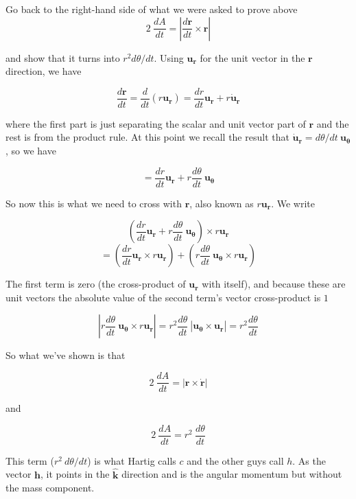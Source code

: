 \documentclass[11pt, oneside]{article}   	%
\begin{document}
Go back to the right-hand side of what we were asked to prove above
\[ 2 \ \frac{dA}{dt} =  | \frac{d\mathbf{r}}{dt} \times \mathbf{r} | \]

and show that it turns into $r^2 d\theta/dt$.  Using $\mathbf{u_r}$ for the unit vector in the $\mathbf{r}$ direction, we have

\[ \frac{d\mathbf{r}}{dt}  = \frac{d}{dt} (r \mathbf{u_r}) = \frac{dr}{dt} \mathbf{u_r} + r \dot{\mathbf{u}}_\mathbf{r} \]

where the first part is just separating the scalar and unit vector part of $\mathbf{r}$ and the rest is from the product rule.  At this point we recall the result that $\dot{\mathbf{u}}_\mathbf{r}  = d \theta/dt \ \mathbf{u_\theta}$, so we have

\[ = \frac{dr}{dt} \mathbf{u_r} + r  \frac{d \theta}{dt} \ \mathbf{u_\theta} \]

So now this is what we need to cross with $\mathbf{r}$, also known as $r \mathbf{u_r}$.  We write

\[ (\frac{dr}{dt}  \mathbf{u_r} + r  \frac{d \theta}{dt} \  \mathbf{u_\theta}) \times r  \mathbf{u_r} \]
\[ = (\frac{dr}{dt}  \mathbf{u_r} \times  r  \mathbf{u_r}) + (r  \frac{d \theta}{dt} \  \mathbf{u_\theta} \times r  \mathbf{u_r}) \]

The first term is zero (the cross-product of $\mathbf{u_r}$ with itself), and because these are unit vectors the absolute value of the second term's vector cross-product is $1$

\[ | r  \frac{d \theta}{dt} \ \mathbf{u_\theta} \times r \mathbf{u_r} | =  r^2 \frac{d \theta}{dt} \ |  \mathbf{u_\theta} \times  \mathbf{u_r} | =  r^2 \frac{d \theta}{dt} \]

So what we've shown is that 

\[ 2 \ \frac{dA}{dt} =  | \mathbf{r} \times \dot{\mathbf{r}} | \]

and

\[ 2 \ \frac{dA}{dt} =  r^2 \ \frac{d \theta}{dt} \]

This term ($r^2 \ d\theta/dt$) is what Hartig calls $c$ and the other guys call $h$.  As the vector $\mathbf{h}$, it points in the $\hat{\mathbf{k}}$ direction and is the angular momentum but without the mass component.
\end{document}
